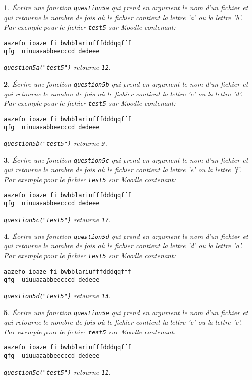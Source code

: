 \documentclass[10pt]{article}
\newtheorem{exi}{}
\newenvironment{exo}{\begin{exi}\em}{\end{exi}}
\begin{document}
\vspace*{-2ex}
\begin{exo}
    Écrire une fonction {\tt question5a} qui prend en argument le nom d'un fichier et qui retourne le nombre de fois où le fichier contient la lettre 'a' ou la
lettre 'b'.
Par exemple pour le fichier \verb+test5+ sur Moodle contenant: 
\begin{verbatim} 
aazefo ioaze fi bwbblariufffdddqqfff
qfg  uiuuaaabbeecccd dedeee
\end{verbatim} 
\verb+question5a("test5")+ retourne \verb+12+.
\end{exo}
\vspace*{-2ex}
\begin{exo}
    Écrire une fonction {\tt question5b} qui prend en argument le nom d'un fichier et qui retourne le nombre de fois où le fichier contient la lettre 'c' ou la
lettre 'd'.
Par exemple pour le fichier \verb+test5+ sur Moodle contenant: 
\begin{verbatim} 
aazefo ioaze fi bwbblariufffdddqqfff
qfg  uiuuaaabbeecccd dedeee
\end{verbatim} 
\verb+question5b("test5")+ retourne \verb+9+.
\end{exo}
\vspace*{-2ex}
\begin{exo}
    Écrire une fonction {\tt question5c} qui prend en argument le nom d'un fichier et qui retourne le nombre de fois où le fichier contient la lettre 'e' ou la
lettre 'f'.
Par exemple pour le fichier \verb+test5+ sur Moodle contenant: 
\begin{verbatim} 
aazefo ioaze fi bwbblariufffdddqqfff
qfg  uiuuaaabbeecccd dedeee
\end{verbatim} 
\verb+question5c("test5")+ retourne \verb+17+.
\end{exo}
\vspace*{-2ex}
\begin{exo}
    Écrire une fonction {\tt question5d} qui prend en argument le nom d'un fichier et qui retourne le nombre de fois où le fichier contient la lettre 'd' ou la
lettre 'a'.
Par exemple pour le fichier \verb+test5+ sur Moodle contenant: 
\begin{verbatim} 
aazefo ioaze fi bwbblariufffdddqqfff
qfg  uiuuaaabbeecccd dedeee
\end{verbatim} 
\verb+question5d("test5")+ retourne \verb+13+.
\end{exo}
\vspace*{-2ex}
\begin{exo}
    Écrire une fonction {\tt question5e} qui prend en argument le nom d'un fichier et qui retourne le nombre de fois où le fichier contient la lettre 'e' ou la
lettre 'c'.
Par exemple pour le fichier \verb+test5+ sur Moodle contenant: 
\begin{verbatim} 
aazefo ioaze fi bwbblariufffdddqqfff
qfg  uiuuaaabbeecccd dedeee
\end{verbatim} 
\verb+question5e("test5")+ retourne \verb+11+.
\end{exo}
\end{document}
